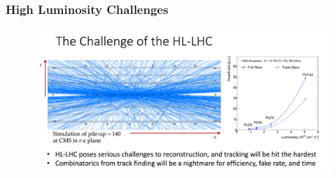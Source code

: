 \begin{frame}
\frametitle{High Luminosity Challenges}

\begin{figure}[htbp]
\begin{center}
\includegraphics[width=1.0\textwidth]{images/hllhc-reco-tracking.png}
\end{center}
\end{figure}


\end{frame}


